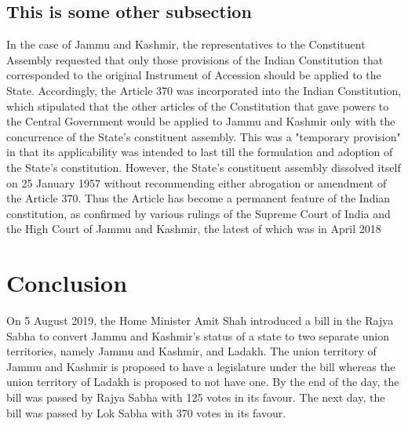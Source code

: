 \documentclass{article}
\begin{document}
\subsection{This is some other subsection}
In the case of Jammu and Kashmir, the representatives to the Constituent Assembly requested that only those provisions of the Indian Constitution that corresponded to the original Instrument of Accession should be applied to the State. Accordingly, the Article 370 was incorporated into the Indian Constitution, which stipulated that the other articles of the Constitution that gave powers to the Central Government would be applied to Jammu and Kashmir only with the concurrence of the State's constituent assembly. This was a "temporary provision" in that its applicability was intended to last till the formulation and adoption of the State's constitution. However, the State's constituent assembly dissolved itself on 25 January 1957 without recommending either abrogation or amendment of the Article 370. Thus the Article has become a permanent feature of the Indian constitution, as confirmed by various rulings of the Supreme Court of India and the High Court of Jammu and Kashmir, the latest of which was in April 2018
\section{Conclusion}
On 5 August 2019, the Home Minister Amit Shah introduced a bill in the Rajya Sabha to convert Jammu and Kashmir's status of a state to two separate union territories, namely Jammu and Kashmir, and Ladakh. The union territory of Jammu and Kashmir is proposed to have a legislature under the bill whereas the union territory of Ladakh is proposed to not have one. By the end of the day, the bill was passed by Rajya Sabha with 125 votes in its favour. The next day, the bill was passed by Lok Sabha with 370 votes in its favour.

\printbibliography[heading=bibintoc]

\balance
\end{document}
